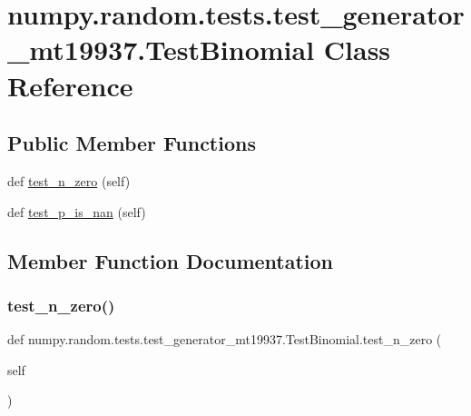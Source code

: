 \hypertarget{classnumpy_1_1random_1_1tests_1_1test__generator__mt19937_1_1TestBinomial}{}\section{numpy.\+random.\+tests.\+test\+\_\+generator\+\_\+mt19937.\+Test\+Binomial Class Reference}
\label{classnumpy_1_1random_1_1tests_1_1test__generator__mt19937_1_1TestBinomial}
\subsection*{Public Member Functions}
\begin{DoxyCompactItemize}
\item 
def \hyperlink{classnumpy_1_1random_1_1tests_1_1test__generator__mt19937_1_1TestBinomial_a88872a06664facaee692756f8f2d9051}{test\+\_\+n\+\_\+zero} (self)
\item 
def \hyperlink{classnumpy_1_1random_1_1tests_1_1test__generator__mt19937_1_1TestBinomial_a9116e57797e4d8df991711c6fab3fc24}{test\+\_\+p\+\_\+is\+\_\+nan} (self)
\end{DoxyCompactItemize}


\subsection{Member Function Documentation}
\mbox{\label{classnumpy_1_1random_1_1tests_1_1test__generator__mt19937_1_1TestBinomial_a88872a06664facaee692756f8f2d9051}} 
\subsubsection{\texorpdfstring{test\+\_\+n\+\_\+zero()}{test\_n\_zero()}}
{\footnotesize\ttfamily def numpy.\+random.\+tests.\+test\+\_\+generator\+\_\+mt19937.\+Test\+Binomial.\+test\+\_\+n\+\_\+zero (\begin{DoxyParamCaption}\item[{}]{self }\end{DoxyParamCaption})}

